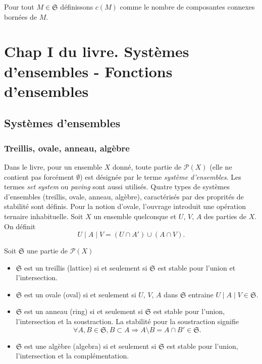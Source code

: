 \begin{defi}
Pour tout $M \in \mathfrak{S}$ définissons $c(M)$ comme le nombre de composantes connexes bornées de $M$.
\end{defi}

\section{Chap I du livre. Systèmes d'ensembles - Fonctions d'ensembles}\label{SystFoncEns}
\subsection{Systèmes d'ensembles}\label{SystEns}
\subsubsection{Treillis, ovale, anneau, algèbre}
Dans le livre, pour un ensemble $X$ donné, toute partie de $\mathcal{P}(X)$ (elle ne contient pas forcément $\emptyset$) est désignée par le terme \emph{système d'ensembles}. Les termes \emph{set system} ou \emph{paving} sont aussi utilisés. Quatre types de systèmes d'ensembles (treillis, ovale, anneau, algèbre), caractérisés par des proprités de stabilité sont définis. Pour la notion d'ovale, l'ouvrage introduit une opération ternaire inhabituelle.\newline
Soit $X$ un ensemble quelconque et $U$, $V$, $A$ des parties de $X$. On définit
\begin{displaymath}
  U \mid A \mid V = (U \cap A') \cup ( A \cap V).
\end{displaymath}

\begin{defi}
  Soit $\mathfrak{S}$ une partie de $\mathcal{P}(X)$
  \begin{itemize}
    \item $\mathfrak{S}$ est un treillis (lattice) si et seulement si $\mathfrak{S}$ est stable pour l'union et l'intersection.
    \item $\mathfrak{S}$ est un ovale (oval) si et seulement si $U$, $V$, $A$ dans $\mathfrak{S}$ entraine $U \mid A \mid V \in \mathfrak{S}$.
    \item $\mathfrak{S}$ est un anneau (ring) si et seulement si $\mathfrak{S}$ est stable pour l'union, l'intersection et la soustraction. La stabilité pour la soustraction signifie
    \begin{displaymath}
      \forall A, B \in \mathfrak{S}, B \subset A \Rightarrow A \setminus B = A \cap B' \in \mathfrak{S}.
    \end{displaymath}
    \item $\mathfrak{S}$ est une algèbre (algebra) si et seulement si $\mathfrak{S}$ est stable pour l'union, l'intersection et la complémentation.
  \end{itemize}
\end{defi}

